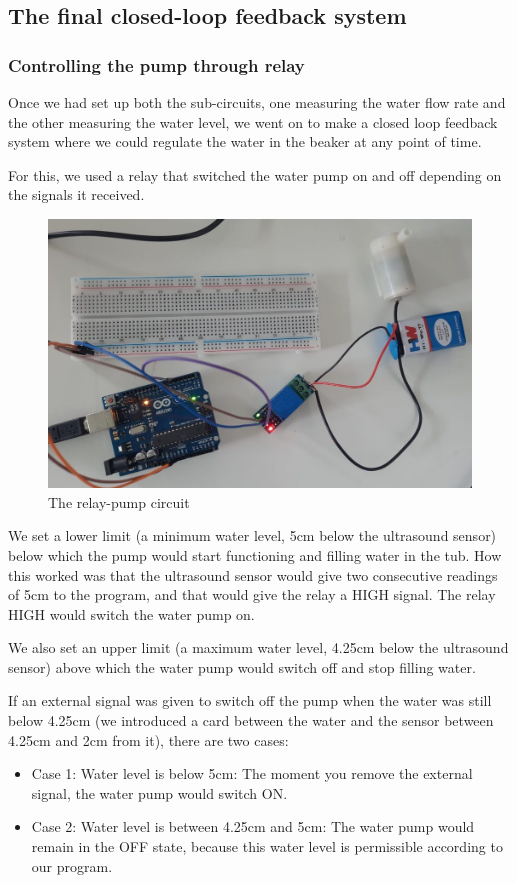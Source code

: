 \documentclass[12pt]{article}
\begin{document}
\subsection*{The final closed-loop feedback system}
\subsubsection*{Controlling the pump through relay}
Once we had set up both the sub-circuits, one measuring the water flow rate and the other measuring the water level, we went on to make a closed loop feedback system where we could regulate the water in the beaker at any point of time.

For this, we used a relay that switched the water pump on and off depending on the signals it received.

\begin{figure}[h!]
    \centering
    \includegraphics[scale=0.2]{relay-pump circuit.jpg}
    \caption{The relay-pump circuit}
    \label{fig:my_label}
\end{figure}

We set a lower limit (a minimum water level, 5cm below the ultrasound sensor) below which the pump would start functioning and filling water in the tub. How this worked was that the ultrasound sensor would give two consecutive readings of 5cm to the program, and that would give the relay a HIGH signal. The relay HIGH would switch the water pump on.

We also set an upper limit (a maximum water level, 4.25cm below the ultrasound sensor) above which the water pump would switch off and stop filling water. 

If an external signal was given to switch off the pump when the water was still below 4.25cm (we introduced a card between the water and the sensor between 4.25cm and 2cm from it), there are two cases:
\begin{itemize}
   
 \item Case 1: Water level is below 5cm: The moment you remove the external signal, the water pump would switch ON.

 \item Case 2: Water level is between 4.25cm and 5cm: The water pump would remain in the OFF state, because this water level is permissible according to our program.

\end{itemize}
\end{document}
